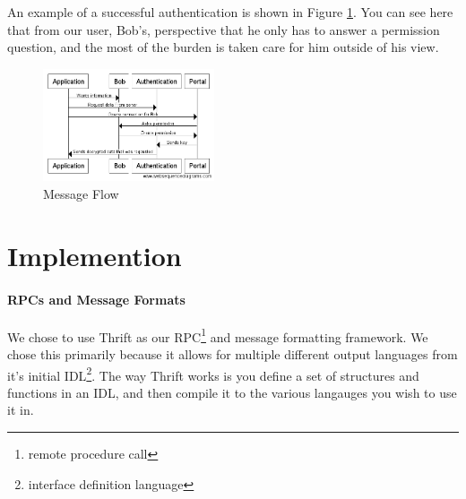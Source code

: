 \documentclass[letterpaper,twocolumn,10pt]{article}
\begin{document}

An example of a successful authentication is shown in Figure \ref{messageflow}. You can see here that from our user, Bob's, perspective that he only has to answer a permission question, and the most of the burden is taken care for him outside of his view.

\begin{figure}[ht]
\includegraphics[width=0.45\textwidth]{messageDiagram}
\caption{Message Flow}
\label{messageflow}
\end{figure}

\section{Implemention}

\paragraph{RPCs and Message Formats}
    We chose to use Thrift\cite{thrift} as our RPC\footnote{remote procedure call} and message formatting framework. We chose this primarily because it allows for multiple different output languages from it's initial IDL\footnote{interface definition language}. The way Thrift works is you define a set of structures and functions in an IDL, and then compile it to the various langauges you wish to use it in. 
    

%
\end{document}
